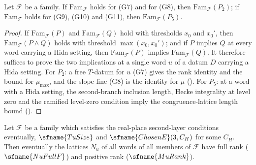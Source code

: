 \begin{proposition}\label{pf:open0:twofive}
Let $\mathcal F$ be a family. If $\mathrm{Fam}_{\mathcal F}$ holds for (G7) and for (G8), then $\mathrm{Fam}_{\mathcal F}(P_2)$; if
$\mathrm{Fam}_{\mathcal F}$ holds for (G9), (G10) and (G11), then $\mathrm{Fam}_{\mathcal F}(P_5)$.
\end{proposition}

\begin{proof}
If $\mathrm{Fam}_{\mathcal F}(P)$ and $\mathrm{Fam}_{\mathcal F}(Q)$ hold with thresholds $x_0$ and $x_0'$, then
$\mathrm{Fam}_{\mathcal F}(P\wedge Q)$ holds with threshold $\max(x_0,x_0')$; and if $P$ implies $Q$ at every word carrying a Hida
setting, then $\mathrm{Fam}_{\mathcal F}(P)$ implies $\mathrm{Fam}_{\mathcal F}(Q)$. It therefore suffices to prove the two
implications at a single word $u$ of a datum $D$ carrying a Hida setting. For $P_2$: a free $T$-datum for $u$ (G7) gives the
rank identity and the bound for $\mu_{\max}$, and the slope line (G8) is the identity for $\mu$
(). For $P_5$: at a word with a
Hida setting, the second-branch inclusion length, Hecke integrality at level zero and the ramified level-zero condition imply
the congruence-lattice length bound ().
\end{proof}

\begin{lemma}[Ranks]\label{pf:open0:fullrank}
Let $\mathcal F$ be a family which satisfies the real-place second-layer conditions eventually, $\sfname{TuSize}$ and
$\sfname{ChosenE}(3,C_H)$ for some $C_H$. Then eventually the lattices $N_u$ of all words of all members of $\mathcal F$ have
full rank ($\sfname{NuFullF}$) and positive rank ($\sfname{MuRank}$).
\ 
\end{lemma}

